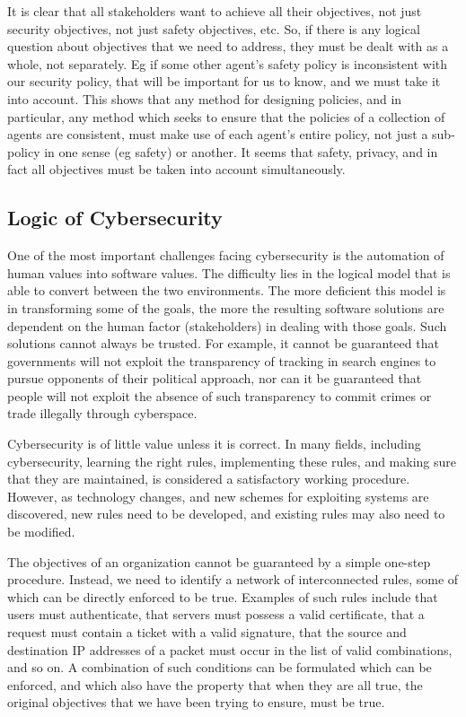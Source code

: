 It is clear that all stakeholders want to achieve all their objectives,
not just security objectives, not just safety objectives, etc. So, if
there is any logical question about objectives that we need to address,
they must be dealt with as a whole, not separately. Eg if some other
agent's safety policy is inconsistent with our security policy, that will
be important for us to know, and we must take it into account. This
shows that any method for designing policies, and in particular,
any method which seeks to ensure that the policies of a collection of
agents are consistent, must make use of each agent's entire policy,
not just a sub-policy in one sense (eg safety) or another. It seems
that safety, privacy, and in fact all objectives must be taken into
account simultaneously.

\subsection{Logic of Cybersecurity}
One of the most important challenges facing cybersecurity is the
automation of human values into software values. The difficulty
lies in the logical model that is able to convert between the two
environments. The more deficient this model is in transforming some of
the goals, the more the resulting software solutions are dependent on the
human factor (stakeholders) in dealing with those goals. Such solutions
cannot always be trusted. For example, it cannot be guaranteed that
governments will not exploit  the transparency of tracking in search
engines to pursue opponents of their political approach, nor can it be
guaranteed that people will not exploit the absence of such transparency
to commit crimes or trade illegally through cyberspace.

Cybersecurity is of little value unless it is correct. In many fields,
including cybersecurity, learning the right rules, implementing
these rules, and making sure that they are maintained, is considered
a satisfactory working procedure. However, as technology changes, and
new schemes for exploiting systems are discovered, new rules need to be
developed, and existing rules may also need to be modified.

The objectives of an organization cannot be guaranteed by a simple
one-step procedure. Instead, we need to identify a network of
interconnected rules, some of which can be directly enforced to be
true. Examples of such rules include that users must authenticate, that
servers must possess a valid certificate, that a request must contain
a ticket with a valid signature, that the source and destination IP
addresses of a packet must occur in the list of valid combinations, and
so on. A combination of such conditions can be formulated which can be
enforced, and which also have the property that when they are all true,
the original objectives that we have been trying to ensure, must be true.

